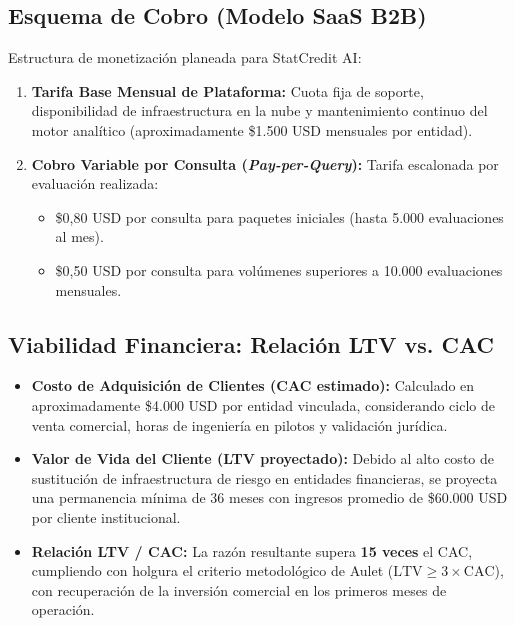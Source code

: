 \documentclass[11pt,a4paper]{article}
\begin{document}
\subsection{Esquema de Cobro (Modelo SaaS B2B)}
Estructura de monetizaci\'on planeada para StatCredit AI:
\begin{enumerate}[leftmargin=*]
    \item \textbf{Tarifa Base Mensual de Plataforma:} Cuota fija de soporte, disponibilidad de infraestructura en la nube y mantenimiento continuo del motor anal\'itico (aproximadamente \$1.500 USD mensuales por entidad).
    \item \textbf{Cobro Variable por Consulta (\textit{Pay-per-Query}):} Tarifa escalonada por evaluaci\'on realizada:
    \begin{itemize}
        \item \$0,80 USD por consulta para paquetes iniciales (hasta 5.000 evaluaciones al mes).
        \item \$0,50 USD por consulta para vol\'umenes superiores a 10.000 evaluaciones mensuales.
    \end{itemize}
\end{enumerate}

\subsection{Viabilidad Financiera: Relaci\'on LTV vs. CAC}
\begin{itemize}[leftmargin=*]
    \item \textbf{Costo de Adquisici\'on de Clientes (CAC estimado):} Calculado en aproximadamente \$4.000 USD por entidad vinculada, considerando ciclo de venta comercial, horas de ingenier\'ia en pilotos y validaci\'on jur\'idica.
    \item \textbf{Valor de Vida del Cliente (LTV proyectado):} Debido al alto costo de sustituci\'on de infraestructura de riesgo en entidades financieras, se proyecta una permanencia m\'inima de 36 meses con ingresos promedio de \$60.000 USD por cliente institucional.
    \item \textbf{Relaci\'on LTV / CAC:} La raz\'on resultante supera \textbf{15 veces} el CAC, cumpliendo con holgura el criterio metodol\'ogico de Aulet ($\text{LTV} \ge 3\times \text{CAC}$), con recuperaci\'on de la inversi\'on comercial en los primeros meses de operaci\'on.
\end{itemize}

\newpage

\end{document}
